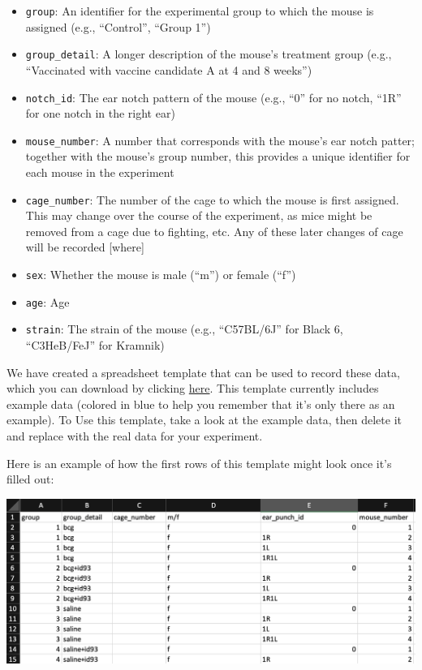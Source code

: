 \documentclass[
]{book}
\providecommand{\tightlist}{%
  \setlength{\itemsep}{0pt}\setlength{\parskip}{0pt}}
\begin{document}
\begin{itemize}
\tightlist
\item
  \texttt{group}: An identifier for the experimental group to which the mouse
  is assigned (e.g., ``Control'', ``Group 1'')
\item
  \texttt{group\_detail}: A longer description of the mouse's treatment group
  (e.g., ``Vaccinated with vaccine candidate A at 4 and 8 weeks'')
\item
  \texttt{notch\_id}: The ear notch pattern of the mouse (e.g., ``0'' for no notch,
  ``1R'' for one notch in the right ear)
\item
  \texttt{mouse\_number}: A number that corresponds with the mouse's ear notch patter;
  together with the mouse's group number, this provides
  a unique identifier for each mouse in the experiment
\item
  \texttt{cage\_number}: The number of the cage to which the mouse is first assigned.
  This may change over the course of the experiment, as mice might be removed from
  a cage due to fighting, etc. Any of these later changes of cage will be
  recorded {[}where{]}
\item
  \texttt{sex}: Whether the mouse is male (``m'') or female (``f'')
\item
  \texttt{age}: Age
\item
  \texttt{strain}: The strain of the mouse (e.g., ``C57BL/6J'' for Black 6, ``C3HeB/FeJ'' for
  Kramnik)
\end{itemize}

We have created a spreadsheet template that can be used to record these data,
which you can download by clicking \href{https://github.com/csu-impactb/CODING-TEAM-BOOKDOWN-/raw/main/DATA/mice_id_sheet.xlsx}{here}. This template currently includes
example data (colored in blue to help you remember that it's only there as an
example). To Use this template, take a look at the example data, then delete it
and replace with the real data for your experiment.

Here is an example of how the first rows of this template might look once it's
filled out:

\includegraphics[width=1\linewidth]{figures/initial_data_template_example}
\end{document}

